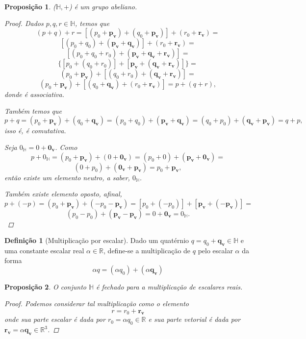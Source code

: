\documentclass[a4paper,12pt]{report}
\theoremstyle{plain}
\newtheorem{proposicao}{Proposição}[section]
\theoremstyle{definition}
\newtheorem{definicao}{Definição}[section]
\begin{document}
	\begin{proposicao}
		($\mathbb{H},+$) é um grupo abeliano.
		\begin{proof}
			Dados $p,q,r \in \mathbb{H}$, temos que
			$$(p+q)+r=[(p_0+\mathbf{p_v})+(q_0+\mathbf{p_v})]+(r_0+\mathbf{r_v})=$$$$[(p_0+q_0)+(\mathbf{p_v}+\mathbf{q_v})]+(r_0+\mathbf{r_v})=$$$$[(p_0+q_0+r_0)+(\mathbf{p_v}+\mathbf{q_v}+\mathbf{r_v})]=$$$$\{[p_0+(q_0+r_0)]+[\mathbf{p_v}+(\mathbf{q_v}+\mathbf{r_v})]\}=$$$$(p_0+\mathbf{p_v})+[(q_0+r_0)+(\mathbf{q_v}+\mathbf{r_v})]=$$$$(p_0+\mathbf{p_v})+[(q_0+\mathbf{q_v})+(r_0+\mathbf{r_v})]=p+(q+r),$$ donde é associativa.
			
			\noindent Também temos que $$p+q=(p_0+\mathbf{p_v})+(q_0+\mathbf{q_v})=(p_0+q_0)+(\mathbf{p_v}+\mathbf{q_v})=(q_0+p_0)+(\mathbf{q_v}+\mathbf{p_v})=q+p,$$ isso é, é comutativa.
			
			\noindent Seja $0_{\mathbb{H}}=0+\mathbf{0_v}$. Como $$p+0_{\mathbb{H}}=(p_0+\mathbf{p_v})+(0+\mathbf{0_v})=(p_0+0)+(\mathbf{p_v}+\mathbf{0_v})=$$$$(0+p_0)+(\mathbf{0_v}+\mathbf{p_v})=p_0+\mathbf{p_v},$$ então existe um elemento neutro, a saber, $0_{\mathbb{H}}$.
			
			\noindent Também existe elemento oposto, afinal, $$p+(-p)= (p_0+\mathbf{p_v})+(-p_0-\mathbf{p_v})=[p_0+(-p_0)]+[\mathbf{p_v}+(\mathbf{-p_v})]=$$$$(p_0-p_0)+(\mathbf{p_v}-\mathbf{p_v})=0+\mathbf{0_v}=0_{\mathbb{H}}.$$
		\end{proof}
	\end{proposicao}
	
	\begin{definicao}[Multiplicação por escalar]
		Dado um quatérnio $q=q_0+\mathbf{q_v} \in \mathbb{H}$ e uma constante escalar real $\alpha \in \mathbb{R}$, define-se a multiplicação de $q$ pelo escalar $\alpha$ da forma
		$$\alpha q=(\alpha q_0)+(\alpha \mathbf{q_v})$$
	\end{definicao}
	
	\begin{proposicao}
		O conjunto $\mathbb{H}$ é fechado para a multiplicação de escalares reais.
		\begin{proof}
			Podemos considerar tal multiplicação como o elemento 
			\begin{equation*}
				r=r_0+\mathbf{r_v}
			\end{equation*}
			onde sua parte escalar é dada por $r_0=\alpha q_0 \in \mathbb{R}$ e sua parte vetorial é dada por $\mathbf{r_v}=\alpha \mathbf{q_v} \in \mathbb{R}^3$.
		\end{proof}
	\end{proposicao}
	
\end{document}
